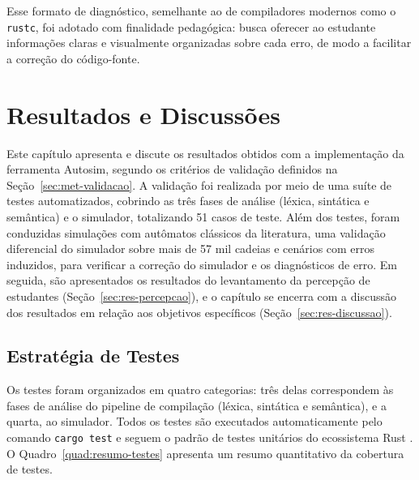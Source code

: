 \documentclass[
    12pt
    ,oneside
    ,a4paper
    ,chapter=TITLE
    ,section=TITLE
    ,sumario=abnt-6027-2012]{abntex2}
\begin{document}
Esse formato de diagnóstico, semelhante ao de compiladores modernos como o \texttt{rustc},
foi adotado com finalidade pedagógica: busca oferecer ao estudante informações claras e
visualmente organizadas sobre cada erro, de modo a facilitar a correção do código-fonte.

\chapter{Resultados e Discussões}
\label{cap:resultados}

Este capítulo apresenta e discute os resultados obtidos com a implementação da ferramenta
Autosim, segundo os critérios de validação definidos na Seção~\ref{sec:met-validacao}.
A validação foi realizada por meio de uma suíte de testes automatizados, cobrindo as três
fases de análise (léxica, sintática e semântica) e o simulador, totalizando 51 casos de
teste. Além dos testes, foram conduzidas simulações com autômatos clássicos da literatura,
uma validação diferencial do simulador sobre mais de 57 mil cadeias e cenários com erros
induzidos, para verificar a correção do simulador e os diagnósticos de erro. Em seguida, são
apresentados os resultados do levantamento da percepção de estudantes
(Seção~\ref{sec:res-percepcao}), e o capítulo se encerra com a discussão dos resultados em
relação aos objetivos específicos (Seção~\ref{sec:res-discussao}).

\section{Estratégia de Testes}
\label{sec:res-estrategia}

Os testes foram organizados em quatro categorias: três delas correspondem às fases de
análise do pipeline de compilação (léxica, sintática e semântica), e a quarta, ao
simulador. Todos os testes são executados automaticamente pelo comando
\texttt{cargo test} e seguem o padrão de testes unitários do ecossistema Rust
\cite{klabnik2019}. O Quadro~\ref{quad:resumo-testes} apresenta um resumo quantitativo
da cobertura de testes.
\end{document}
